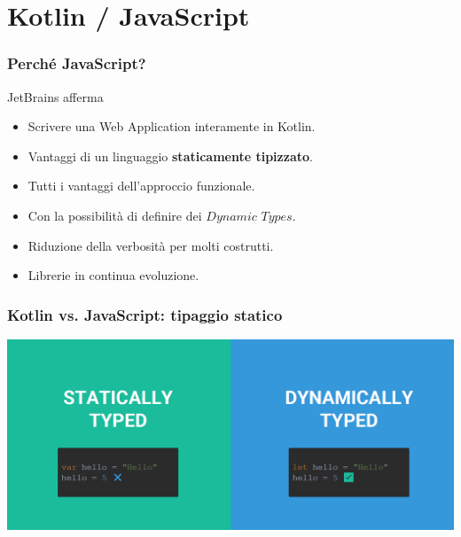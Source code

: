     \section{Kotlin / JavaScript}
    \begin{frame}
      \frametitle{Perché JavaScript?}
      \begin{block}{JetBrains afferma}
        \begin{itemize}[<+->]
          \item Scrivere una Web Application interamente in Kotlin.
          \bigskip
          \item Vantaggi di un linguaggio \textbf{staticamente tipizzato}.
          \bigskip
          \item Tutti i vantaggi dell'approccio funzionale.
          \bigskip
          \item Con la possibilità di definire dei $Dynamic$ $Types$.
          \bigskip
          \item Riduzione della verbosità per molti costrutti.
          \bigskip
          \item Librerie in continua evoluzione.
          \bigskip
        \end{itemize}
      \end{block}
    \end{frame}

    \begin{frame}
      \frametitle{Kotlin vs. JavaScript: tipaggio statico}
      \begin{center}
        \includegraphics[scale=0.35]{StatVSDinPNG}
      \end{center}
    \end{frame}

